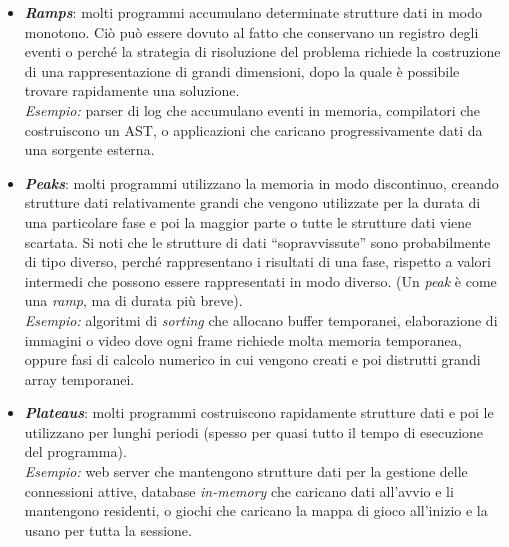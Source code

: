 \begin{itemize}
  \item \textbf{\textit{Ramps}}: molti programmi accumulano determinate strutture dati in modo monotono. Ciò può essere dovuto al fatto che conservano un registro degli eventi o perché la strategia di risoluzione del problema richiede la costruzione di una rappresentazione di grandi dimensioni, dopo la quale è possibile trovare rapidamente una soluzione.\\
  \textit{Esempio:} parser di log che accumulano eventi in memoria, compilatori che costruiscono un AST, o applicazioni che caricano progressivamente dati da una sorgente esterna.

  \item \textbf{\textit{Peaks}}: molti programmi utilizzano la memoria in modo discontinuo, creando strutture dati relativamente grandi che vengono utilizzate per la durata di una particolare fase e poi la maggior parte o tutte le strutture dati viene scartata. Si noti che le strutture di dati “sopravvissute” sono probabilmente di tipo diverso, perché rappresentano i risultati di una fase, rispetto a valori intermedi che possono essere rappresentati in modo diverso. (Un \textit{peak} è come una \textit{ramp}, ma di durata più breve).\\
  \textit{Esempio:} algoritmi di \textit{sorting} che allocano buffer temporanei, elaborazione di immagini o video dove ogni frame richiede molta memoria temporanea, oppure fasi di calcolo numerico in cui vengono creati e poi distrutti grandi array temporanei.

  \item \textbf{\textit{Plateaus}}: molti programmi costruiscono rapidamente strutture dati e poi le utilizzano per lunghi periodi (spesso per quasi tutto il tempo di esecuzione del programma).\\
  \textit{Esempio:} web server che mantengono strutture dati per la gestione delle connessioni attive, database \textit{in-memory} che caricano dati all’avvio e li mantengono residenti, o giochi che caricano la mappa di gioco all’inizio e la usano per tutta la sessione.
\end{itemize}

